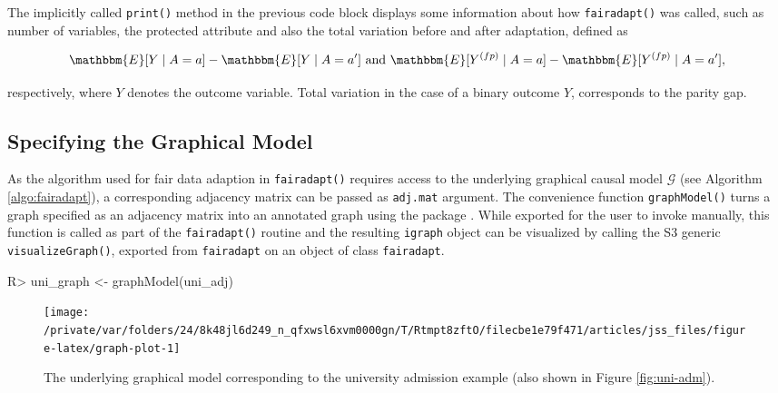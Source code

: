 \documentclass[
  nojss]{jss}
\begin{document}
The implicitly called \texttt{print()} method in the previous code block
displays some information about how \texttt{fairadapt()} was called,
such as number of variables, the protected attribute and also the total
variation before and after adaptation, defined as

\[\mathbbm{E}[Y \mid A = a] - \mathbbm{E}[Y \mid A = a'] \text{ and } \mathbbm{E}[ {Y}^{(fp)} \mid A = a] - \mathbbm{E}[ {Y}^{(fp)} \mid A = a'],\]

respectively, where \(Y\) denotes the outcome variable. Total variation
in the case of a binary outcome \(Y\), corresponds to the parity gap.

\hypertarget{specifying-the-graphical-model}{%
\subsection{Specifying the Graphical
Model}\label{specifying-the-graphical-model}}

As the algorithm used for fair data adaption in \texttt{fairadapt()}
requires access to the underlying graphical causal model \(\mathcal{G}\)
(see Algorithm \ref{algo:fairadapt}), a corresponding adjacency matrix
can be passed as \texttt{adj.mat} argument. The convenience function
\texttt{graphModel()} turns a graph specified as an adjacency matrix
into an annotated graph using the  package
\citep{csardi2006igraph}. While exported for the user to invoke
manually, this function is called as part of the \texttt{fairadapt()}
routine and the resulting \texttt{igraph} object can be visualized by
calling the S3 generic \texttt{visualizeGraph()}, exported from
\texttt{fairadapt} on an object of class \texttt{fairadapt}.

\begin{CodeChunk}
\begin{CodeInput}
R> uni_graph <- graphModel(uni_adj)
\end{CodeInput}
\end{CodeChunk}

\begin{CodeChunk}
\begin{figure}

{\centering \texttt{[image: /private/var/folders/24/8k48jl6d249\_n\_qfxwsl6xvm0000gn/T/Rtmpt8zftO/filecbe1e79f471/articles/jss\_files/figure-latex/graph-plot-1]} 

}

\caption{The underlying graphical model corresponding to the university admission example (also shown in Figure \ref{fig:uni-adm}).}\label{fig:graph-plot}
\end{figure}
\end{CodeChunk}
\end{document}
